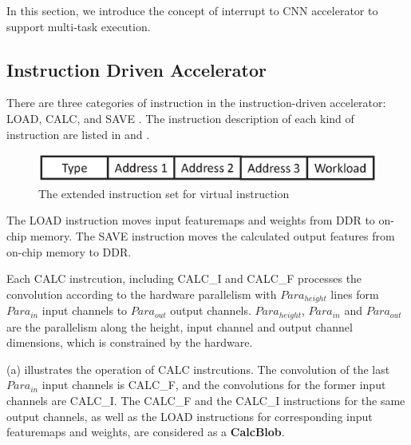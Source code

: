 
In this section, we introduce the concept of interrupt to CNN accelerator to support multi-task execution.

\subsection{ Instruction Driven Accelerator }

There are three categories of instruction in the instruction-driven accelerator: LOAD, CALC, and SAVE \cite{guo2017angel, yu2018instruction}. The instruction description of each kind of instruction are listed in  and .


\begin{figure}[h]
	\centering
	\includegraphics[width=0.9\linewidth]{fig/normal_instr.eps}
	\caption{The extended instruction set for virtual instruction }
	\label{fig:normal_instr}
\end{figure}

The LOAD instruction moves input featuremaps and weights from DDR to on-chip memory. The SAVE instruction moves the calculated output features from on-chip memory to DDR. 

 Each CALC  instrcution,  including CALC\_I and CALC\_F processes the convolution according to the hardware parallelism with $Para_{height}$ lines form $ Para_{in} $ input channels to $ Para_{out}$ output channels. $Para_{height}$, $ Para_{in} $ and $ Para_{out} $ are the parallelism along the height, input channel and output channel dimensions, which is constrained by the hardware.

 (a) illustrates the operation of CALC instrcutions. The convolution of the last $ Para_{in} $ input channels is CALC\_F, and the convolutions for the former input channels are CALC\_I. The CALC\_F and the CALC\_I instructions for the same output channels, as well as the LOAD instructions for corresponding input featuremaps and weights, are considered as a \textbf{CalcBlob}.

